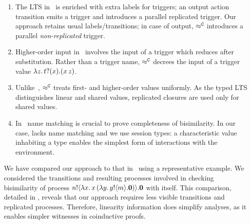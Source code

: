 \documentclass[a4paper,UKenglish]{lipics}
\theoremstyle{definition}
\begin{document}
\begin{enumerate}[$\bullet$]
\item 
The LTS in~\cite{JeffreyR05} is enriched with extra labels for triggers;
an output action transition emits a trigger and introduces a parallel replicated trigger.
Our 
approach retains usual labels/transitions; in  case of output,
$\approx^\mathtt{C}$
introduces a parallel
\emph{non-replicated} trigger.

\item Higher-order input in~\cite{JeffreyR05} involves 
the input of a trigger which reduces after substitution.
Rather than a trigger name, %
$\approx^\mathtt{C}$
decrees the input of a trigger value $\lambda z.\,t ? (x) . (x\, {z})$.

\item Unlike~\cite{JeffreyR05}, 
$\approx^\mathtt{C}$ treats  
first- and higher-order values uniformly. %
As the typed LTS distinguishes linear and shared values,
replicated closures are used only for shared values.

\item In~\cite{JeffreyR05}   name matching   is
crucial to prove completeness of bisimilarity.
In our case, \HOp lacks name matching and 
we use session types: a characteristic value inhabiting a type enables the simplest form of interactions with the environment.


\end{enumerate}
\noi 
We have compared our approach to that in~\cite{JeffreyR05} 
using a representative example.
We considered the transitions and resulting processes involved in checking bisimilarity of process 
$n ! \langle \lambda x.\,x\, {(}\lambda y.\,y ! \langle m \rangle . \mathbf{0}) \rangle . \mathbf{0}$
with itself.
This comparison, detailed in , reveals that our approach 
requires less visible transitions and replicated processes. 
Therefore, linearity information does simplify analyses, 
as it enables simpler witnesses in  coinductive proofs.
\end{document}
